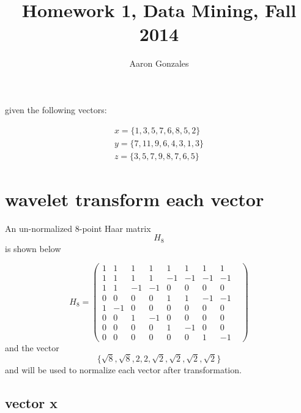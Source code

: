 \documentclass{article}
\begin{document}
\title{Homework 1, Data Mining, Fall 2014}
\author{Aaron Gonzales}
\maketitle


given the following vectors:

\begin{align}
	x = \{1, 3, 5, 7, 6, 8, 5, 2\}  \\
	y = \{7, 11, 9, 6, 4, 3, 1, 3\}  \\
	z = \{3, 5, 7, 9, 8, 7, 6, 5\}  
\end{align}

\section{wavelet transform each vector}
An un-normalized 8-point Haar matrix \[H_8\] is shown below

\[ H_{8} =  
\begin{pmatrix} 
	1&1&1&1&1&1&1&1 \\ 
	1&1&1&1&-1&-1&-1&-1 \\
	1&1&-1&-1&0&0&0&0& \\ 
	0&0&0&0&1&1&-1&-1 \\ 
	1&-1&0&0&0&0&0&0& \\
	0&0&1&-1&0&0&0&0 \\ 
	0&0&0&0&1&-1&0&0& \\ 
	0&0&0&0&0&0&1&-1 
\end{pmatrix}
\]
and the vector 
\[ \{ \sqrt{8}, \sqrt{8} ,2, 2, \sqrt{2}, \sqrt{2}, \sqrt{2}, \sqrt{2} \} \]
and will be used to normalize each vector after transformation.

\subsection{vector x}
\end{document}
